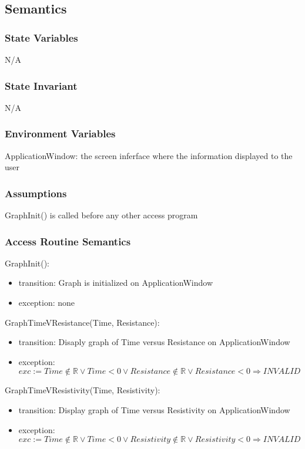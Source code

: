 \documentclass[12pt, titlepage]{article}
\begin{document}
\subsection{Semantics}

\subsubsection{State Variables}

N/A

\subsubsection{State Invariant}

N/A
\subsubsection{Environment Variables}

ApplicationWindow: the screen inferface where the information displayed to the user

\subsubsection{Assumptions}

GraphInit() is called before any other access program

\subsubsection{Access Routine Semantics}

\noindent GraphInit():
\begin{itemize}
\item transition: Graph is initialized on ApplicationWindow
\item exception: none
\end{itemize}

\noindent GraphTimeVResistance(Time, Resistance):
\begin{itemize}
\item transition: Disaply graph of Time versus Resistance on ApplicationWindow 
\item exception: $exc:= Time \notin  \mathbb{R} \lor Time < 0 \lor  Resistance \notin  \mathbb{R} \lor Resistance < 0\Rightarrow INVALID$
\end{itemize}

\noindent GraphTimeVResistivity(Time, Resistivity):
\begin{itemize}
\item transition: Display graph of Time versus Resistivity on ApplicationWindow
\item exception: $exc:= Time \notin  \mathbb{R} \lor Time < 0 \lor  Resistivity \notin  \mathbb{R} \lor Resistivity < 0\Rightarrow INVALID$
\end{itemize}
\end{document}
